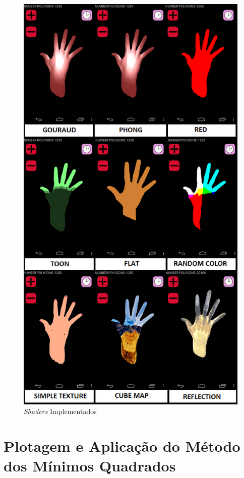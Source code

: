 	\begin{figure}[h]
	\centering
		\includegraphics[keepaspectratio=true,scale=0.7]{figuras/shaders_impl.png}
	\caption{\textit{Shaders} Implementados}
	\label{shaders_impl}
	\end{figure}


\section{Plotagem e Aplicação do Método dos Mínimos Quadrados}

